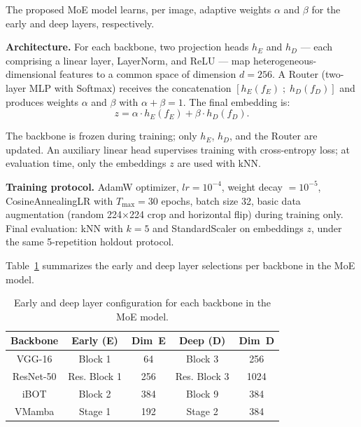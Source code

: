 \documentclass[conference]{IEEEtran}
\begin{document}
The proposed MoE model learns, per image, adaptive weights $\alpha$ and
$\beta$ for the early and deep layers, respectively.

\textbf{Architecture.} For each backbone, two projection heads $h_E$ and
$h_D$ — each comprising a linear layer, LayerNorm, and ReLU — map
heterogeneous-dimensional features to a common space of dimension $d=256$.
A Router (two-layer MLP with Softmax) receives the concatenation
$[h_E(f_E) \; ; \; h_D(f_D)]$ and produces weights $\alpha$ and $\beta$ with
$\alpha + \beta = 1$.
The final embedding is:
\begin{equation}
    z = \alpha \cdot h_E(f_E) + \beta \cdot h_D(f_D).
    \label{eq:moe}
\end{equation}

The backbone is frozen during training; only $h_E$, $h_D$, and the Router
are updated.
An auxiliary linear head supervises training with cross-entropy loss; at
evaluation time, only the embeddings $z$ are used with kNN.

\textbf{Training protocol.}
AdamW optimizer, $lr = 10^{-4}$, weight decay $= 10^{-5}$,
CosineAnnealingLR with $T_{\max} = 30$ epochs, batch size 32, basic data
augmentation (random 224$\times$224 crop and horizontal flip) during
training only.
Final evaluation: kNN with $k=5$ and StandardScaler on embeddings $z$,
under the same 5-repetition holdout protocol.

Table~\ref{tab_moe_config} summarizes the early and deep layer selections
per backbone in the MoE model.

\begin{table}[htbp]
\caption{Early and deep layer configuration for each backbone in the MoE
         model.}
\begin{center}
\begin{tabular}{c|c|c|c|c}
\hline
\textbf{Backbone} & \textbf{Early (E)} & \textbf{Dim~E}
                  & \textbf{Deep (D)} & \textbf{Dim~D} \\
\hline
VGG-16    & Block 1     & 64   & Block 3     & 256  \\
ResNet-50 & Res. Block 1 & 256  & Res. Block 3 & 1024 \\
iBOT      & Block 2     & 384  & Block 9     & 384  \\
VMamba    & Stage 1     & 192  & Stage 2     & 384  \\
\hline
\end{tabular}
\label{tab_moe_config}
\end{center}
\end{table}
\end{document}
